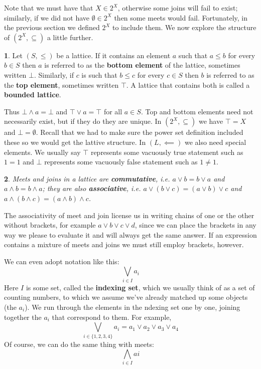 \documentclass[oneside,english]{amsbook}
\numberwithin{section}{chapter}
\theoremstyle{plain}
\newtheorem{thm}{\protect\theoremname}
\theoremstyle{definition}
\newtheorem{defn}[thm]{\protect\definitionname}
\providecommand{\definitionname}{Definition}
\providecommand{\theoremname}{Theorem}
\begin{document}
Note that we must have that $X\in2^{X}$, otherwise some joins will fail to exist; similarly, if we did not have $\emptyset\in2^{X}$ then some meets would fail. Fortunately, in the previous section we defined $2^{X}$ to include them. We now explore the structure of $(2^{X},\subseteq)$ a little further. 

\begin{defn} 
	Let $(S,\le)$ be a lattice. If it contains an element $a$ such that $a\le b$ for every $b\in S$ then $a$ is referred to as the \textbf{bottom element} of the lattice, sometimes written $\bot$. Similarly, if $c$ is such that $b\le c$ for every $c\in S$ then $b$ is referred to as the \textbf{top element}, sometimes written $\top$. A lattice that contains both is called a \textbf{bounded lattice}. 
\end{defn} 

Thus $\bot\land a=\bot$ and $\top\lor a=\top$ for all $a\in S$. Top and bottom elements need not necessarily exist, but if they do they are unique. In $(2^{X},\subseteq)$ we have $\top=X$ and $\bot=\emptyset$. Recall that we had to make sure the power set definition included these so we would get the lattive structure. In $(L,\impliedby)$ we also need special elements. We usually say $\top$ represents some vacuously true statement such as $1=1$ and $\bot$ represents some vacuously false statement such as $1\ne1$. 

\begin{thm} 
	Meets and joins in a lattice are \textbf{commutative}, i.e. $a\lor b=b\lor a$ and $a\land b=b\land a$; they are also \textbf{associative}, i.e. $a\lor(b\lor c)=(a\lor b)\lor c$ and $a\land(b\land c)=(a\land b)\land c$. 
\end{thm} 

The associativity of meet and join license us in writing chains of one or the other without brackets, for example $a\lor b\lor c\lor d$, since we can place the brackets in any way we please to evaluate it and will always get the same answer. If an expression contains a mixture of meets and joins we must still employ brackets, however.

We can even adopt notation like this: 
	\[ \bigvee_{i\in I}a_{i} \]
Here $I$ is some set, called the \textbf{indexing set}, which we usually think of as a set of counting numbers, to which we assume we've already matched up some objects (the $a_{i}$). We run through the elements in the ndexing set one by one, joining together the $a_{i}$ that correspond to them. For example, 
	\[ \bigvee_{i\in\{1,2,3,4\}}a_{i}=a_{1}\lor a_{2}\lor a_{3}\lor a_{4} \]
 Of course, we can do the same thing with meets: 
 	\[ \bigwedge_{i\in I}ai \]
\end{document}
